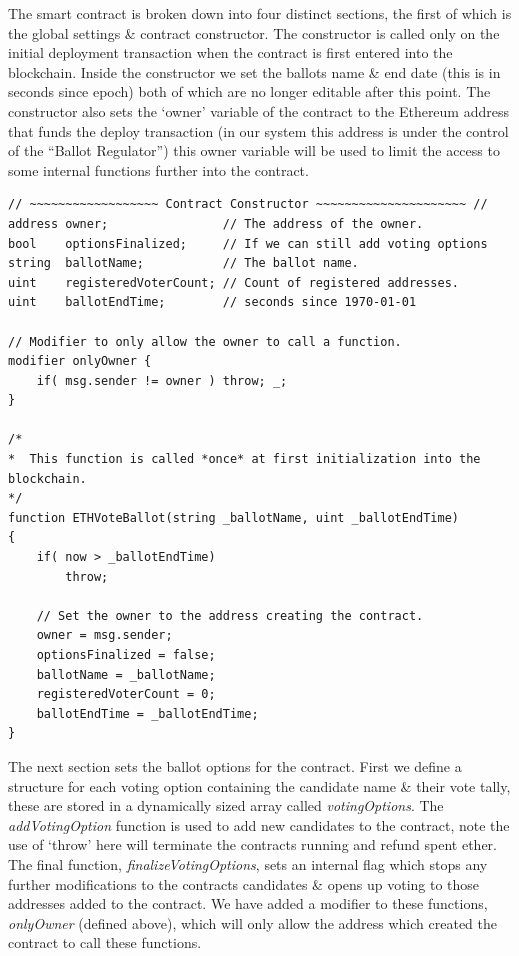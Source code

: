 \documentclass{article}
\begin{document}
The smart contract is broken down into four distinct sections, the first of which is the global settings \& contract constructor. The constructor is called only on the initial deployment transaction when the contract is first entered into the blockchain. Inside the constructor we set the ballots name \& end date (this is in seconds since epoch) both of which are no longer editable after this point. The constructor also sets the `owner' variable of the contract to the Ethereum address that funds the deploy transaction (in our system this address is under the control of the ``Ballot Regulator'') this owner variable will be used to limit the access to some internal functions further into the contract.

\begin{lstlisting}[caption=Contract constructor called when deploying the contract.]
// ~~~~~~~~~~~~~~~~~~ Contract Constructor ~~~~~~~~~~~~~~~~~~~~~ //
address owner;                // The address of the owner. 
bool    optionsFinalized;     // If we can still add voting options
string  ballotName;           // The ballot name.
uint    registeredVoterCount; // Count of registered addresses.
uint    ballotEndTime;        // seconds since 1970-01-01

// Modifier to only allow the owner to call a function.
modifier onlyOwner {
    if( msg.sender != owner ) throw; _;
}

/*
*  This function is called *once* at first initialization into the blockchain.
*/
function ETHVoteBallot(string _ballotName, uint _ballotEndTime)
{
    if( now > _ballotEndTime)
        throw;

    // Set the owner to the address creating the contract.
    owner = msg.sender;
    optionsFinalized = false; 
    ballotName = _ballotName;
    registeredVoterCount = 0;
    ballotEndTime = _ballotEndTime;
}
\end{lstlisting}

\cleardoublepage
The next section sets the ballot options for the contract. First we define a structure for each voting option containing the candidate name \& their vote tally, these are stored in a dynamically sized array called \textit{votingOptions}. The \textit{addVotingOption} function is used to add new candidates to the contract, note the use of `throw' here will terminate the contracts running and refund spent ether. The final function, \textit{finalizeVotingOptions}, sets an internal flag which stops any further modifications to the contracts candidates \& opens up voting to those addresses added to the contract. We have added a modifier to these functions, \textit{onlyOwner} (defined above), which will only allow the address which created the contract to call these functions.
\end{document}
